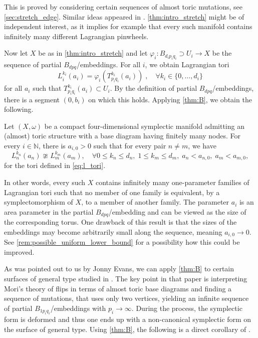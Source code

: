 \documentclass[12pt,a4paper,abstract=true,final]{scrartcl}
\begin{document}
This is proved by considering certain sequences of almost toric mutations, see \cref{sec:stretch_edge}.
Similar ideas appeared in \cite{EvaUrz21}.
\cref{thm:intro_stretch} might be of independent interest, as it implies for example that every such manifold contains infinitely many different Lagrangian pinwheels. 

Now let $X$ be as in \cref{thm:intro_stretch} and let $\varphi_i \colon B_{d_i p_i q_i} \supset U_i \rightarrow X$ be the sequence of partial $B_{dpq}$\-/embeddings.
For all $i$, we obtain Lagrangian tori
\begin{equation}
    \label{eq:l_tori}
    L^{k_i}_i(a_i) = \varphi_i(T^{k_i}_{p_i q_i}(a_i))\;, \quad
    \forall k_i \in \{0,\ldots,d_i\}
\end{equation}
for all $a_i$ such that $T^{k_i}_{p_i q_i}(a_i) \subset U_i$.
By the definition of partial $B_{dpq}$\-/embeddings, there is a segment $(0,b_i)$ on which this holds.
Applying \cref{thm:B}, we obtain the following.
   

\begin{maintheorem}
    \label{thm:C}
    Let $(X,\omega)$ be a compact four-dimensional symplectic manifold admitting an (almost) toric structure with a base diagram having finitely many nodes.
For every $i \in \mathbb{N}$, there is $a_{i,0} > 0$ such that for every pair $n \neq m$, we have
    \begin{equation}
        L^{k_n}_n(a_n) \ncong L^{k_m}_m(a_m), \quad
        \forall 0 ≤ k_n ≤ d_n,\; 1 ≤ k_m ≤ d_m, \; a_n < a_{n,0}, \; a_m < a_{m,0},
    \end{equation}
    for the tori defined in \eqref{eq:l_tori}.
\end{maintheorem}

In other words, every such $X$ contains infinitely many one-parameter families of Lagrangian tori such that no member of one family is equivalent,  by a symplectomorphism of $X$, to a member of another family.
The parameter $a_i$ is an area parameter in the partial $B_{dpq}$\-/embedding and can be viewed as the size of the corresponding torus.
One drawback of this result is that the sizes of the embeddings may become arbitrarily small along the sequence, meaning $a_{i,0} \rightarrow 0$.
See \cref{rem:possible_uniform_lower_bound} for a possibility how this could be improved.

As was pointed out to us by Jonny Evans, we can apply \cref{thm:B} to certain surfaces of general type studied in \cite{EvaUrz21}.
The key point in that paper is interpreting Mori's theory of flips in terms of almost toric base diagrams and finding a sequence of mutations, that uses only two vertices,  yielding an infinite sequence of partial $B_{1p_iq_i}$\-/embeddings with $p_i \rightarrow \infty$.
During the process, the symplectic form is deformed and thus one ends up with a non-canonical symplectic form on the surface of general type.
Using \cref{thm:B}, the following is a direct corollary of \cite[Theorem 1.1]{EvaUrz21}.
\end{document}
